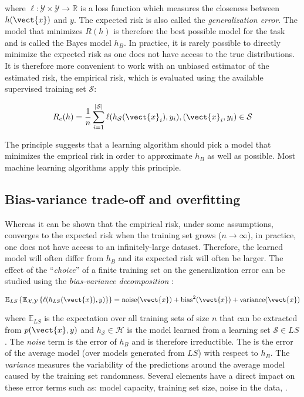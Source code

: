 where $\ell: \mathcal{Y}\times\mathcal{Y} \rightarrow \mathbb{R}$ is a loss function
which measures the closeness between $h(\vect{x})$ and $y$. The expected risk is
also called the \textit{generalization error}. The model that minimizes $R(h)$ is
therefore the best possible model for the task and is called the Bayes model $h_B$.
In practice, it is rarely possible to directly minimize the expected risk as one
does not have access to the true distributions. It is therefore more convenient
to work with an unbiased estimator of the estimated risk, the empirical risk,
which is evaluated using the available supervised training set $\mathcal{S}$:

\begin{equation}
\label{eqn:backml:empiricalrisk}
R_e(h) = \frac{1}{n} \sum_{i=1}^{|\mathcal{S}|} \ell(h_\mathcal{S}(\vect{x}_i), y_i), (\vect{x}_i, y_i) \in \mathcal{S}
\end{equation}

The  principle suggests that a learning algorithm should pick a
model that minimizes the emprical risk in order to approximate $h_B$ as well as
possible. Most machine learning algorithms apply this principle.

\subsection{Bias-variance trade-off and overfitting}
\label{ssec:backml:bvtradeoff}

Whereas it can be shown that the empirical risk, under some assumptions, converges
to the expected risk when the training set grows ($n \rightarrow \infty$), in
practice, one does not have access to an infinitely-large dataset. Therefore, the
learned model will often differ from $h_B$ and its expected risk will often be
larger. The effect of the ``\textit{choice}'' of a finite training set on the
generalization error can be studied using the \textit{bias-variance decomposition}
\parencite{geman1992neural, geurts2009bias, friedman2017elements}:

\begin{equation}
\label{eqn:backml:biasvariancedec}
\mathbb{E}_{LS}\left\{\mathbb{E}_{\mathcal{X},\mathcal{Y}}\left\{ \ell(h_{LS}(\vect{x}), y)\right\}\right\} = \text{noise}(\vect{x}) + \text{bias}^2(\vect{x}) + \text{variance}(\vect{x})
\end{equation}

where $\mathbb{E}_{LS}$ is the expectation over all training sets of size $n$ that
can be extracted from $p(\vect{x},y)$ and $h_{\mathcal{S}} \in \mathcal{H}$ is
the model learned from a learning set $\mathcal{S} \in LS$. The \textit{noise} term
is the error of $h_B$ and is therefore irreductible. The  is the error of the average model (over models generated from $LS$) with respect to $h_B$.
The \textit{variance} measures the variability of the predictions around the
average model caused by the training set randomness. Several elements have a direct
impact on these error terms such as: model capacity, training set size, noise in
the data, \etc.

